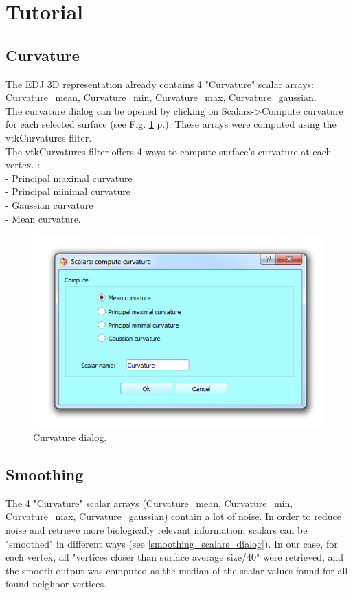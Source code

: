 \documentclass[12pt, a4paper]{book}
\begin{document}
\section{Tutorial}

\subsection{Curvature}
The EDJ 3D representation already contains 4 "Curvature" scalar arrays: Curvature\_mean, Curvature\_min, Curvature\_max, Curvature\_gaussian.\\ 
The curvature dialog can be opened by clicking on Scalars->Compute curvature for each selected surface (see Fig. \ref{curvature_dialog} p.\pageref{curvature_dialog}). These arrays were computed using the vtkCurvatures filter.\\
The vtkCurvatures filter offers 4 ways to compute surface's
curvature at each vertex. :\\
- Principal maximal curvature\\
- Principal minimal curvature\\
- Gaussian curvature\\
- Mean curvature.\\

\begin{figure}
  \centering
  \includegraphics[scale=0.5]{curvature_dialog.png} 
	\caption{Curvature dialog.}
\label{curvature_dialog}
\end{figure}

\subsection{Smoothing}
The 4 "Curvature" scalar arrays (Curvature\_mean, Curvature\_min, Curvature\_max, Curvature\_gaussian) contain a lot of noise. In order to reduce noise and retrieve more biologically relevant information, scalars can be "smoothed" in different ways (see \ref{smoothing_scalars_dialog}). In our case, for each vertex, all "vertices closer than surface average size/40" were retrieved, and the smooth output was computed as the median of the scalar values found for all found neighbor vertices.
\end{document}
